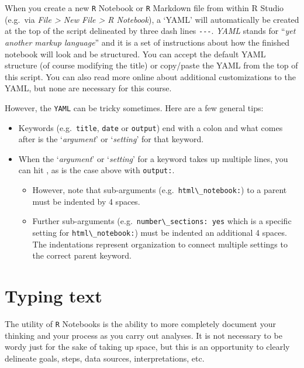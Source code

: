 \documentclass[
]{book}
\newcommand{\passthrough}[1]{#1}
\providecommand{\tightlist}{%
  \setlength{\itemsep}{0pt}\setlength{\parskip}{0pt}}
\begin{document}
When you create a new \passthrough{\lstinline!R!} Notebook or \passthrough{\lstinline!R!} Markdown file from within R Studio (e.g.~via \emph{File \textgreater{} New File \textgreater{} R Notebook}), a `YAML' will automatically be created at the top of the script delineated by three dash lines \passthrough{\lstinline!---!}. \emph{YAML} stands for ``\emph{yet another markup language}'' and it is a set of instructions about how the finished notebook will look and be structured. You can accept the default YAML structure (of course modifying the title) or copy/paste the YAML from the top of this script. You can also read more online about additional customizations to the YAML, but none are necessary for this course.

However, the \passthrough{\lstinline!YAML!} can be tricky sometimes. Here are a few general tips:

\begin{itemize}
\tightlist
\item
  Keywords (e.g.~\passthrough{\lstinline!title!}, \passthrough{\lstinline!date!} or \passthrough{\lstinline!output!}) end with a colon and what comes after is the `\emph{argument}' or `\emph{setting}' for that keyword.\\
\item
  When the `\emph{argument}' or `\emph{setting}' for a keyword takes up multiple lines, you can hit \emph{}, as is the case above with \passthrough{\lstinline!output:!}.

  \begin{itemize}
  \tightlist
  \item
    However, note that sub-arguments (e.g.~\passthrough{\lstinline!html\_notebook:!}) to a parent must be indented by 4 spaces.
  \item
    Further sub-arguments (e.g.~\passthrough{\lstinline!number\_sections: yes!} which is a specific setting for \passthrough{\lstinline!html\_notebook:!}) must be indented an additional 4 spaces. The indentations represent organization to connect multiple settings to the correct parent keyword.
  \end{itemize}
\end{itemize}

\hypertarget{typing-text}{%
\section*{Typing text}\label{typing-text}}

The utility of \passthrough{\lstinline!R!} Notebooks is the ability to more completely document your thinking and your process as you carry out analyses. It is not necessary to be wordy just for the sake of taking up space, but this is an opportunity to clearly delineate goals, steps, data sources, interpretations, etc.
\end{document}
